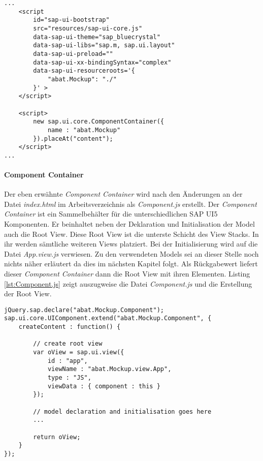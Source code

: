 	\begin{lstlisting}[frame=htrbl, caption=Bootstrapping der SAP UI5 Applikation, label=lst:index.html]
...
	<script
		id="sap-ui-bootstrap"
		src="resources/sap-ui-core.js"
		data-sap-ui-theme="sap_bluecrystal"
		data-sap-ui-libs="sap.m, sap.ui.layout"
		data-sap-ui-preload="" 
		data-sap-ui-xx-bindingSyntax="complex"
		data-sap-ui-resourceroots='{
			"abat.Mockup": "./"
		}' >
	</script>

	<script>
		new sap.ui.core.ComponentContainer({
			name : "abat.Mockup"
		}).placeAt("content");
	</script>
...
	\end{lstlisting}
	
\paragraph{Component Container}$\;$ \\
Der eben erwähnte \textit{Component Container} wird nach den Änderungen an der Datei \textit{index.html} im Arbeitsverzeichnis als \textit{Component.js} erstellt. Der \textit{Component Container} ist ein Sammelbehälter für die unterschiedlichen SAP UI5 Komponenten. Er beinhaltet neben der Deklaration und Initialisation der Model auch die Root View. Diese Root View ist die unterste Schicht des View Stacks. In ihr werden sämtliche weiteren Views platziert. Bei der Initialisierung wird auf die Datei \textit{App.view.js} verwiesen. Zu den verwendeten Models sei an dieser Stelle noch nichts näher erläutert da dies im nächsten Kapitel folgt. Als Rückgabewert liefert dieser \textit{Component Container} dann die Root View mit ihren Elementen. Listing \ref{lst:Component.js} zeigt auszugweise die Datei \textit{Component.js} und die Erstellung der Root View.

	\begin{lstlisting}[frame=htrbl, caption=Auszug aus der Component.js, label=lst:Component.js]
jQuery.sap.declare("abat.Mockup.Component");
sap.ui.core.UIComponent.extend("abat.Mockup.Component", {
	createContent : function() {

		// create root view
		var oView = sap.ui.view({
			id : "app",
			viewName : "abat.Mockup.view.App",
			type : "JS",
			viewData : { component : this }
		});

		// model declaration and initialisation goes here
		...

		return oView;
	}
});
	\end{lstlisting}
	
